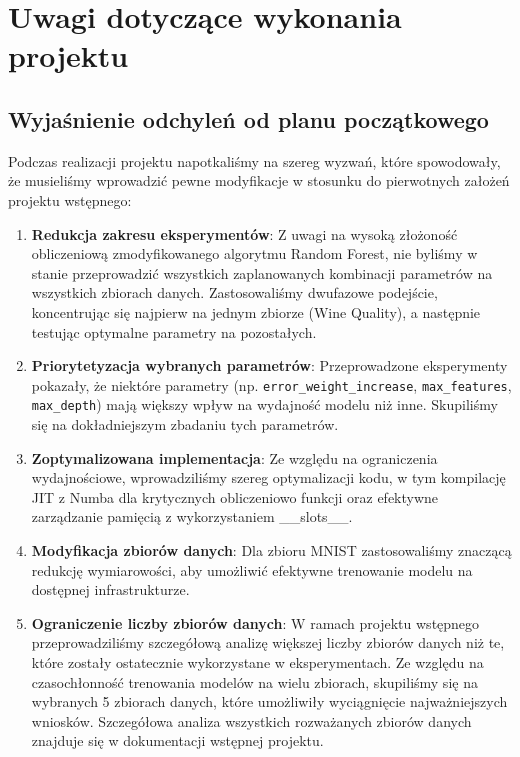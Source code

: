 \documentclass[11pt,a4paper]{article}
\begin{document}
\section{Uwagi dotyczące wykonania projektu}

\subsection{Wyjaśnienie odchyleń od planu początkowego}

Podczas realizacji projektu napotkaliśmy na szereg wyzwań, które spowodowały, że musieliśmy wprowadzić pewne modyfikacje w stosunku do pierwotnych założeń projektu wstępnego:

\begin{enumerate}
    \item \textbf{Redukcja zakresu eksperymentów}: Z uwagi na wysoką złożoność obliczeniową zmodyfikowanego algorytmu Random Forest, nie byliśmy w stanie przeprowadzić wszystkich zaplanowanych kombinacji parametrów na wszystkich zbiorach danych. Zastosowaliśmy dwufazowe podejście, koncentrując się najpierw na jednym zbiorze (Wine Quality), a następnie testując optymalne parametry na pozostałych.

    \item \textbf{Priorytetyzacja wybranych parametrów}: Przeprowadzone eksperymenty pokazały, że niektóre parametry (np. \texttt{error\_weight\_increase}, \texttt{max\_features}, \texttt{max\_depth}) mają większy wpływ na wydajność modelu niż inne. Skupiliśmy się na dokładniejszym zbadaniu tych parametrów.

    \item \textbf{Zoptymalizowana implementacja}: Ze względu na ograniczenia wydajnościowe, wprowadziliśmy szereg optymalizacji kodu, w tym kompilację JIT z Numba dla krytycznych obliczeniowo funkcji oraz efektywne zarządzanie pamięcią z wykorzystaniem \_\_slots\_\_.

    \item \textbf{Modyfikacja zbiorów danych}: Dla zbioru MNIST zastosowaliśmy znaczącą redukcję wymiarowości, aby umożliwić efektywne trenowanie modelu na dostępnej infrastrukturze.

    \item \textbf{Ograniczenie liczby zbiorów danych}: W ramach projektu wstępnego przeprowadziliśmy szczegółową analizę większej liczby zbiorów danych niż te, które zostały ostatecznie wykorzystane w eksperymentach. Ze względu na czasochłonność trenowania modelów na wielu zbiorach, skupiliśmy się na wybranych 5 zbiorach danych, które umożliwiły wyciągnięcie najważniejszych wniosków. Szczegółowa analiza wszystkich rozważanych zbiorów danych znajduje się w dokumentacji wstępnej projektu.
\end{enumerate}
\end{document}
